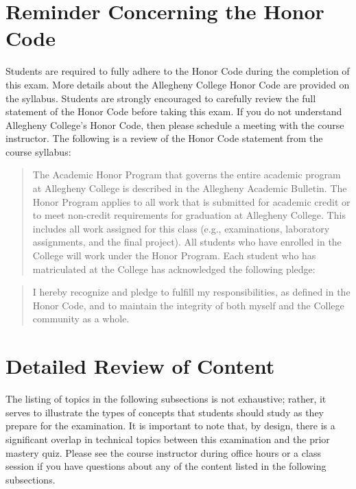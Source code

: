 \documentclass[11pt]{article}
\begin{document}
\section*{Reminder Concerning the Honor Code}

\noindent Students are required to fully adhere to the Honor Code during the
completion of this exam. More details about the Allegheny College Honor Code are
provided on the syllabus. Students are strongly encouraged to carefully review
the full statement of the Honor Code before taking this exam. If you do not
understand Allegheny College's Honor Code, then please schedule a meeting with
the course instructor. The following is a review of the Honor Code statement
from the course syllabus:

\begin{quote}
The Academic Honor Program that governs the entire academic program at
Allegheny College is described in the Allegheny Academic Bulletin. The Honor
Program applies to all work that is submitted for academic credit or to meet
non-credit requirements for graduation at Allegheny College. This includes all
work assigned for this class (e.g., examinations, laboratory assignments, and
the final project). All students who have enrolled in the College will work
under the Honor Program. Each student who has matriculated at the College has
acknowledged the following pledge:
\end{quote}

\vspace*{-.15in}

\begin{quote}
  I hereby recognize and pledge to fulfill my responsibilities, as defined in
  the Honor Code, and to maintain the integrity of both myself and the College
  community as a whole.
\end{quote}

\section*{Detailed Review of Content}

The listing of topics in the following subsections is not exhaustive; rather, it
serves to illustrate the types of concepts that students should study as they
prepare for the examination. It is important to note that, by design, there is a
significant overlap in technical topics between this examination and the prior
mastery quiz. Please see the course instructor during office hours or a class
session if you have questions about any of the content listed in the following
subsections.
\end{document}
